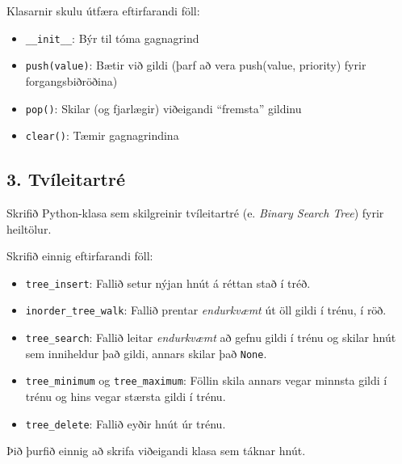 \documentclass{article}
\begin{document}
Klasarnir skulu útfæra eftirfarandi föll:
\begin{itemize}
 \item \verb|__init__|: Býr til tóma gagnagrind
 \item \texttt{push(value)}: Bætir við gildi (þarf að vera push(value, priority) fyrir forgangsbiðröðina)
 \item \texttt{pop()}: Skilar (og fjarlægir) viðeigandi ``fremsta'' gildinu
 \item \texttt{clear()}: Tæmir gagnagrindina
\end{itemize}

\subsection{3. Tvíleitartré}
Skrifið Python-klasa sem skilgreinir tvíleitartré (e. \emph{Binary Search Tree}) fyrir heiltölur.

Skrifið einnig eftirfarandi föll:
\begin{itemize}
 \item \verb|tree_insert|: Fallið setur nýjan hnút á réttan stað í tréð.
 \item \verb|inorder_tree_walk|: Fallið prentar \emph{endurkvæmt} út öll gildi í trénu, í röð.
 \item \verb|tree_search|: Fallið leitar \emph{endurkvæmt} að gefnu gildi í trénu og skilar hnút sem inniheldur það gildi, annars skilar það \verb|None|.
 \item \verb|tree_minimum| og \verb|tree_maximum|: Föllin skila annars vegar minnsta gildi í trénu og hins vegar stærsta gildi í trénu.
 \item \verb|tree_delete|: Fallið eyðir hnút úr trénu. 
\end{itemize}
Þið þurfið einnig að skrifa viðeigandi klasa sem táknar hnút.
\end{document}
